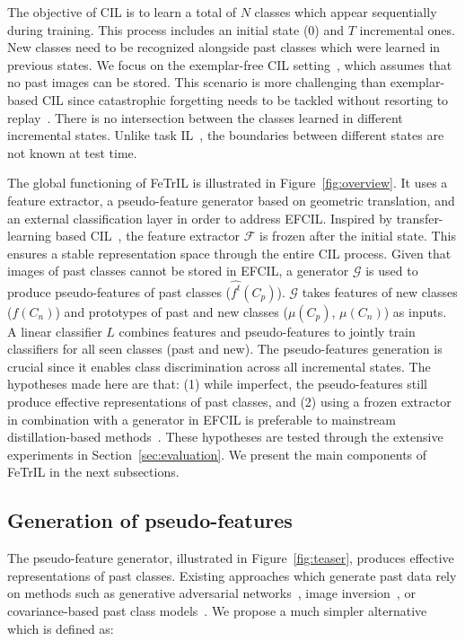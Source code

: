 \documentclass[10pt,twocolumn,letterpaper]{article}
\makeatletter
\newcommand{\ourmodel}{FeTrIL\@\xspace}
\makeatother
\begin{document}
The objective of CIL is to learn a total of $N$ classes which appear sequentially during training. 
This process includes an initial state (0) and $T$ incremental ones. 
New classes need to be recognized alongside past classes which were learned in previous states.
We focus on the exemplar-free CIL setting~\cite{rebuffi2017_icarl,smith2021always,sdc_2020,zhu2022self}, which assumes that no past images can be stored.
This scenario is more challenging than exemplar-based CIL since catastrophic forgetting needs to be tackled without resorting to replay~\cite{masana2021_study}. 
There is no intersection between the classes learned in different incremental states.
Unlike task IL~\cite{van2019three}, the boundaries between different states are not known at test time. 

The global functioning of \ourmodel is illustrated in Figure~\ref{fig:overview}. 
It uses a feature extractor, a pseudo-feature generator based on geometric translation, and an external classification layer in order to address EFCIL.
Inspired by transfer-learning based CIL~\cite{belouadah2018_deesil,rebuffi2017_icarl}, the feature extractor $\mathcal{F}$ is frozen after the initial state.
This ensures a stable representation space through the entire CIL process. 
Given that images of past classes cannot be stored in EFCIL, a generator $\mathcal{G}$ is used to produce pseudo-features of past classes ($\hat{f^t}(C_p)$).
$\mathcal{G}$ takes features of new classes ($f(C_n)$) and prototypes of past and new classes ($\mu(C_p)$, $\mu(C_n)$) as inputs. 
A linear classifier $L$ combines features and pseudo-features to jointly train classifiers for all seen classes (past and new). 
The pseudo-features generation is crucial since it enables class discrimination across all incremental states.
The hypotheses made here are that: 
(1) while imperfect, the pseudo-features still produce effective representations of past classes,
and
(2) using a frozen extractor in combination with a generator in EFCIL is preferable to mainstream distillation-based methods~\cite{sdc_2020,zhu2021class,zhu2021pass,zhu2022self}.
These hypotheses are tested through the extensive experiments in Section~\ref{sec:evaluation}.
We present the main components of \ourmodel in the next subsections. 

\subsection{Generation of pseudo-features}
\label{subsec:gen}
The pseudo-feature generator, illustrated in Figure~\ref{fig:teaser}, produces effective representations of past classes.
Existing approaches which generate past data rely on methods such as generative adversarial networks~\cite{he2018_generative}, image inversion~\cite{smith2021always}, or covariance-based past class models~\cite{zhu2021class}.
We propose a much simpler alternative which is defined as: \vspace{-2mm}
\end{document}

